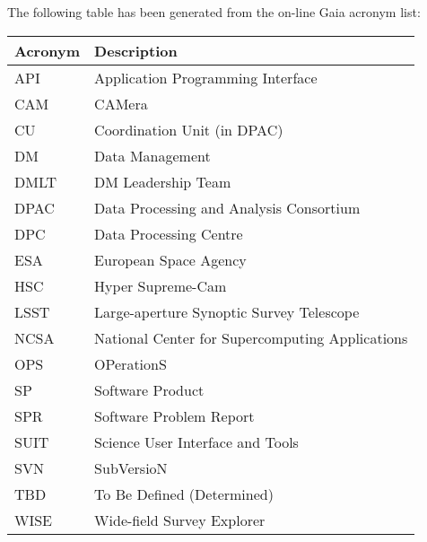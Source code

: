 The following table has been generated from the on-line Gaia acronym list:
\newline\newline%
\addtocounter{table}{-1}
\begin{longtable}{|l|p{}|}\hline 
\textbf{Acronym} & \textbf{Description}  \\\hline
API&Application Programming Interface \\\hline
CAM&CAMera \\\hline
CU&Coordination Unit (in DPAC) \\\hline
DM&Data Management \\\hline
DMLT&DM Leadership Team \\\hline
DPAC&Data Processing and Analysis Consortium \\\hline
DPC&Data Processing Centre \\\hline
ESA&European Space Agency \\\hline
HSC&Hyper Supreme-Cam \\\hline
LSST&Large-aperture Synoptic Survey Telescope \\\hline
NCSA&National Center for Supercomputing Applications \\\hline
OPS&OPerationS \\\hline
SP&Software Product \\\hline
SPR&Software Problem Report \\\hline
SUIT&Science User Interface and Tools \\\hline
SVN&SubVersioN \\\hline
TBD&To Be Defined (Determined) \\\hline
WISE&Wide-field Survey Explorer \\\hline
\end{longtable} 
